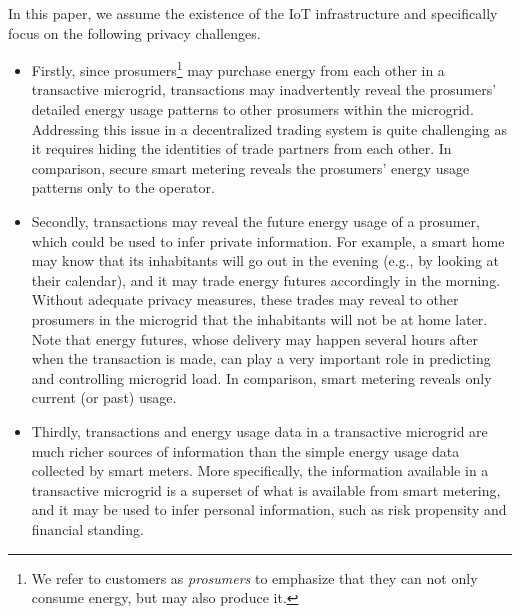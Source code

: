 In this paper, we assume the existence of the IoT infrastructure and specifically focus on the following privacy challenges.
%
%
%
\begin{itemize}[itemsep=0.25\parskip,topsep=-0.5\parskip]
\item Firstly, since prosumers\footnote{We refer to customers as \emph{prosumers} to emphasize that they can not only consume energy, but may also produce it.}  may purchase energy from each other in a transactive microgrid, transactions may inadvertently reveal the prosumers' detailed energy usage patterns to other prosumers within the microgrid.
Addressing this issue in a decentralized trading system is quite challenging as it requires hiding the identities of trade partners from each other.
In comparison, secure smart metering reveals the prosumers' energy usage patterns only to the operator. 
\item Secondly,  transactions may reveal the future energy usage of a prosumer, which could be used to infer private information.
For example, a smart home may know that its inhabitants will go out in the evening (e.g., by looking at their calendar), and it may trade energy futures accordingly in the morning.
Without adequate privacy measures, these trades may reveal to other prosumers in the microgrid that the inhabitants will not be at home later.
Note that energy futures, whose delivery may happen several hours after when the transaction is made, can play a very important role in predicting and controlling microgrid load.
In comparison, smart metering reveals only current (or past) usage.
\item Thirdly, transactions and energy usage data in a transactive microgrid are much richer sources of information than the simple energy usage data collected by smart meters.
More specifically, the information available in a transactive microgrid is a superset of what is available from smart metering, and it may be used to infer personal information, such as risk propensity and financial standing.
\end{itemize}
\vspace{0.5\parskip}

